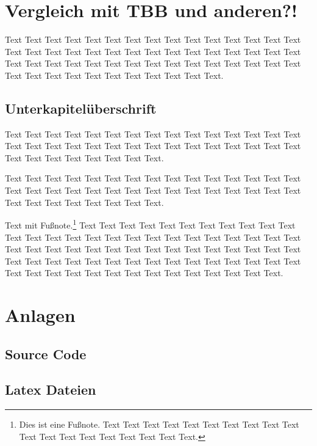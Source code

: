 \documentclass{scrartcl}
\begin{document}
\pagebreak %

\section{Vergleich mit TBB und anderen?!}

Text Text Text Text Text Text Text Text Text Text Text Text Text Text Text Text Text Text Text Text Text Text Text Text Text Text Text Text Text Text Text Text Text Text Text Text Text Text Text Text Text Text Text Text Text Text Text Text Text Text Text Text Text Text Text Text.

\subsection{Unterkapitelüberschrift}

Text Text Text Text Text Text Text Text Text Text Text Text Text Text Text Text Text Text Text Text Text Text Text Text Text Text Text Text Text Text Text Text Text Text Text Text Text Text.


Text Text Text Text Text Text Text Text Text Text Text Text Text Text Text Text Text Text Text Text Text Text Text Text Text Text Text Text Text Text Text Text Text Text Text Text Text Text.

Text mit Fußnote.\footnote{Dies ist eine Fußnote. Text Text Text Text Text Text Text Text Text Text Text Text Text Text Text Text Text Text Text.} Text \cite{Ez99,ABC01} Text Text Text Text Text Text Text Text Text Text Text Text Text Text Text Text Text Text Text Text Text Text Text Text Text Text Text Text  Text Text Text Text Text Text Text Text Text Text Text Text Text Text Text Text Text Text Text Text Text Text Text Text Text Text Text Text Text Text Text Text Text Text Text Text Text Text Text Text Text.

\pagebreak

{}


\newpage

\listoffigures

\listoftables

\section{Anlagen}
\setcounter{subsection}{0} %
\minitoc


\subsection{Source Code}

\subsection{Latex Dateien}
\end{document}
